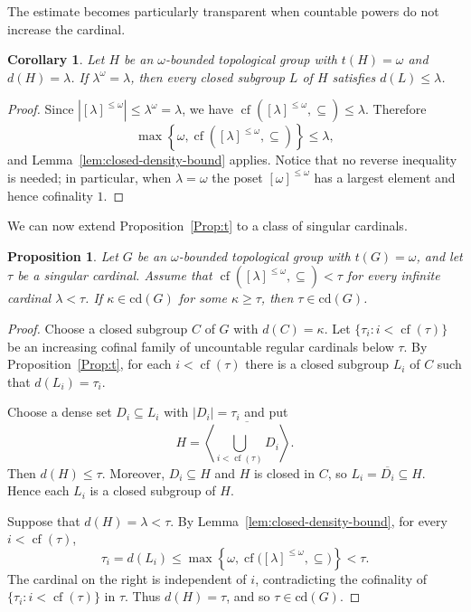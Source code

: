 \documentclass[12pt]{amsart}
\newtheorem{corollary}[theorem]{Corollary}
\newtheorem{proposition}[theorem]{Proposition}
\theoremstyle{definition}
\numberwithin{equation}{section}
\theoremstyle{remark}
\def\cd{\mathrm{cd}}
\begin{document}
The estimate becomes particularly transparent when countable powers do
not increase the cardinal.

\begin{corollary}\label{cor:lambda-omega-monotone}
Let $H$ be an $\omega$-bounded topological group with $t(H)=\omega$ and
$d(H)=\lambda$. If $\lambda^\omega=\lambda$, then every closed subgroup
$L$ of $H$ satisfies $d(L)\leq\lambda$.
\end{corollary}

\begin{proof}
Since $|[\lambda]^{\leq\omega}|\leq\lambda^\omega=\lambda$, we have
$\operatorname{cf}([\lambda]^{\leq\omega},\subseteq)\leq\lambda$.
Therefore
\[
\max\left\{\omega,
\operatorname{cf}([\lambda]^{\leq\omega},\subseteq)\right\}\leq\lambda,
\]
and Lemma~\ref{lem:closed-density-bound} applies. Notice that no reverse inequality is needed; in particular, when $\lambda=\omega$ the poset $[\omega]^{\leq\omega}$ has a largest element and hence cofinality $1$.
\end{proof}

We can now extend Proposition~\ref{Prop:t} to a class of singular
cardinals.

\begin{proposition}\label{prop:singular-omega-bounded}
Let $G$ be an $\omega$-bounded topological group with $t(G)=\omega$, and
let $\tau$ be a singular cardinal. Assume that
$\operatorname{cf}([\lambda]^{\leq\omega},\subseteq)<\tau$ for every
infinite cardinal $\lambda<\tau$. If $\kappa\in\cd(G)$ for some
$\kappa\geq\tau$, then $\tau\in\cd(G)$.
\end{proposition}

\begin{proof}
Choose a closed subgroup $C$ of $G$ with $d(C)=\kappa$. Let
$\{\tau_i:i<\operatorname{cf}(\tau)\}$ be an increasing cofinal family
of uncountable regular cardinals below $\tau$. By
Proposition~\ref{Prop:t}, for each
$i<\operatorname{cf}(\tau)$ there is a closed subgroup $L_i$ of $C$
such that $d(L_i)=\tau_i$.

Choose a dense set $D_i\subseteq L_i$ with $|D_i|=\tau_i$ and put
\[
H=
\overline{\left\langle
\bigcup_{i<\operatorname{cf}(\tau)}D_i
\right\rangle}.
\]
Then $d(H)\leq\tau$. Moreover, $D_i\subseteq H$ and $H$ is closed in
$C$, so $L_i=\overline{D_i}\subseteq H$. Hence each $L_i$ is a
closed subgroup of $H$.

Suppose that $d(H)=\lambda<\tau$. By
Lemma~\ref{lem:closed-density-bound}, for every
$i<\operatorname{cf}(\tau)$,
\[
\tau_i=d(L_i)\leq
\max\left\{\omega,
\operatorname{cf}\bigl([\lambda]^{\leq\omega},\subseteq\bigr)
\right\}<\tau.
\]
The cardinal on the right is independent of $i$, contradicting the
cofinality of $\{\tau_i:i<\operatorname{cf}(\tau)\}$ in $\tau$.
Thus $d(H)=\tau$, and so $\tau\in\cd(G)$.
\end{proof}
\end{document}
